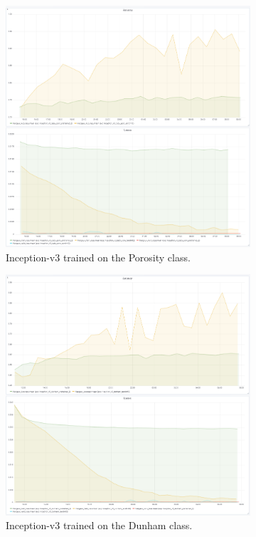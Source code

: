 \iffalse
\begin{figure}
\begin{subfigure}{.5\textwidth}
  \centering
  \includegraphics[width=.8\linewidth]{figures/04-go_poro_acc.PNG}
  \caption{Inception-v3 trained on the Porosity class.}
  \label{fig:alexinit_poro}
\end{subfigure}%
\begin{subfigure}{.5\textwidth}
  \centering
  \includegraphics[width=.8\linewidth]{figures/04-go_dunham_acc.PNG}
  \caption{Inception-v3 trained on the Dunham class.}
  \label{fig:alexinit_dunham}
\end{subfigure}
\begin{subfigure}{.5\textwidth}

\end{subfigure}
\end{figure}

